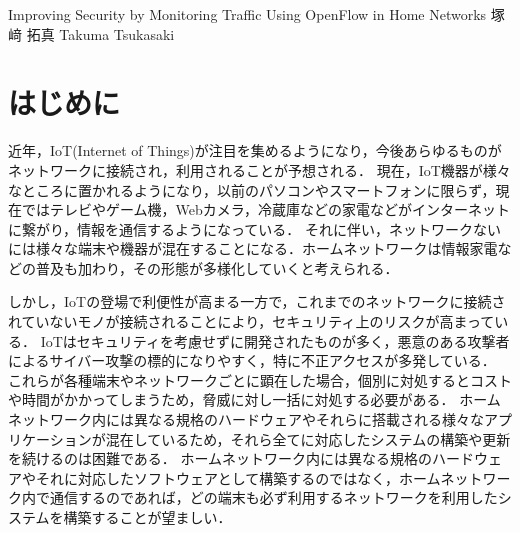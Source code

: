 \documentclass[a4paper,10pt,twocolumn,uplatex]{jsarticle}
\date{10}
\begin{document}
{Improving Security by Monitoring Traffic Using OpenFlow in Home Networks}
{塚﨑 拓真}
{Takuma Tsukasaki}

\section{はじめに}
近年，IoT(Internet of Things)が注目を集めるようになり，今後あらゆるものがネットワークに接続され，利用されることが予想される．
現在，IoT機器が様々なところに置かれるようになり，以前のパソコンやスマートフォンに限らず，現在ではテレビやゲーム機，Webカメラ，冷蔵庫などの家電などがインターネットに繋がり，情報を通信するようになっている．
それに伴い，ネットワークないには様々な端末や機器が混在することになる．ホームネットワークは情報家電などの普及も加わり，その形態が多様化していくと考えられる．\par
しかし，IoTの登場で利便性が高まる一方で，これまでのネットワークに接続されていないモノが接続されることにより，セキュリティ上のリスクが高まっている\cite{guideline}．
IoTはセキュリティを考慮せずに開発されたものが多く，悪意のある攻撃者によるサイバー攻撃の標的になりやすく，特に不正アクセスが多発している．
これらが各種端末やネットワークごとに顕在した場合，個別に対処するとコストや時間がかかってしまうため，脅威に対し一括に対処する必要がある．
ホームネットワーク内には異なる規格のハードウェアやそれらに搭載される様々なアプリケーションが混在しているため，それら全てに対応したシステムの構築や更新を続けるのは困難である．
ホームネットワーク内には異なる規格のハードウェアやそれに対応したソフトウェアとして構築するのではなく，ホームネットワーク内で通信するのであれば，どの端末も必ず利用するネットワークを利用したシステムを構築することが望ましい．

\end{document}
